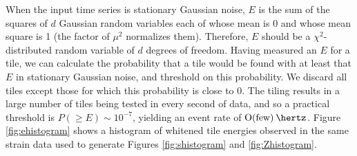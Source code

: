 \documentclass[10pt]{article}
\begin{document}
When the input time series is stationary Gaussian noise, \(E\) is the sum
of the squares of \(d\) Gaussian random variables each of whose mean is 0
and whose mean square is 1 (the factor of \(\mu^{2}\) normalizes them).
Therefore, \(E\) should be a \(\chi^{2}\)-distributed random variable of
\(d\) degrees of freedom.  Having measured an \(E\) for a tile, we can
calculate the probability that a tile would be found with at least that
\(E\) in stationary Gaussian noise, and threshold on this probability.  We
discard all tiles except those for which this probability is close to 0.
The tiling results in a large number of tiles being tested in every second
of data, and so a practical threshold is \(P(\geq E) \sim 10^{-7}\),
yielding an event rate of \(\unit{\order(\text{few})}{\hertz}\).  Figure
\ref{fig:ehistogram} shows a histogram of whitened tile energies observed
in the same strain data used to generate Figures \ref{fig:shistogram} and
\ref{fig:Zhistogram}.
\end{document}
